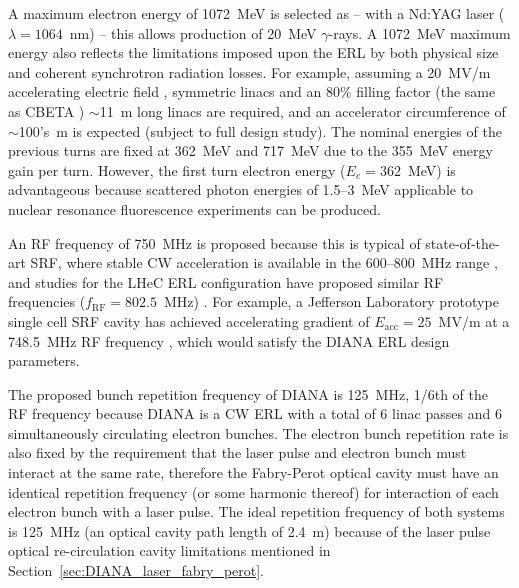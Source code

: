 \documentclass[../main.tex]{subfiles}
\begin{document}
A maximum electron energy of 1072~\si{\mega\electronvolt} is selected as -- with a Nd:YAG laser ($\lambda=1064$~\si{\nano\meter}) -- this allows production of 20~\si{\mega\electronvolt} $\gamma$-rays. A 1072~\si{\mega\electronvolt} maximum energy also reflects the limitations imposed upon the ERL by both physical size and coherent synchrotron radiation losses. For example, assuming a 20~\si{\mega\volt}/\si{\meter} accelerating electric field \cite{ben2006review}, symmetric linacs and an 80\% filling factor (the same as CBETA \cite{hoffstaetter2017cbeta}) $\sim$11~\si{\meter} long linacs are required, and an accelerator circumference of $\sim$100's~\si{\meter} is expected (subject to full design study). The nominal energies of the previous turns are fixed at 362~\si{\mega\electronvolt} and 717~\si{\mega\electronvolt} due to the 355~\si{\mega\electronvolt} energy gain per turn. However, the first turn electron energy ($E_{e}=362$~\si{\mega\electronvolt}) is advantageous because scattered photon energies of 1.5--3~\si{\mega\electronvolt} applicable to nuclear resonance fluorescence experiments \cite{angell2015demonstration,quiter2011transmission} can be produced. 

An RF frequency of 750~\si{\mega\hertz} is proposed because this is typical of state-of-the-art SRF, where stable CW acceleration is available in the 600--800~\si{\mega\hertz} range \cite{calaga2013proposal}, and studies for the LHeC ERL configuration have proposed similar RF frequencies ($f_{\mathrm{RF}}=802.5$~\si{\mega\hertz}) \cite{agostini2021large}. For example, a Jefferson Laboratory prototype single cell SRF cavity has achieved accelerating gradient of $E_{\mathrm{acc}}=25$~\si{\mega\volt}/\si{\meter} at a 748.5~\si{\mega\hertz} RF frequency \cite{rimmer2007jlab}, which would satisfy the DIANA ERL design parameters. 

The proposed bunch repetition frequency of DIANA is 125~\si{\mega\hertz}, 1/6th of the RF frequency because DIANA is a CW ERL with a total of 6 linac passes and 6 simultaneously circulating electron bunches. The electron bunch repetition rate is also fixed by the requirement that the laser pulse and electron bunch must interact at the same rate, therefore the Fabry-Perot optical cavity must have an identical repetition frequency (or some harmonic thereof) for interaction of each electron bunch with a laser pulse. The ideal repetition frequency of both systems is 125~\si{\mega\hertz} (an optical cavity path length of 2.4~\si{\meter}) because of the laser pulse optical re-circulation cavity limitations mentioned in Section~\ref{sec:DIANA_laser_fabry_perot}.
\end{document}
